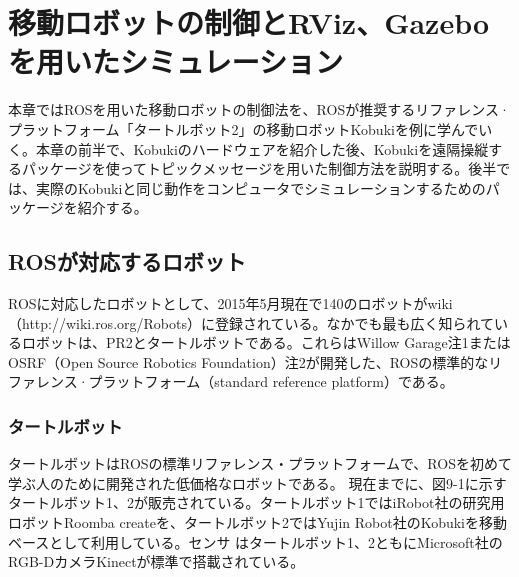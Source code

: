 
\chapter{移動ロボットの制御とRViz、Gazeboを用いたシミュレーション}

本章ではROSを用いた移動ロボットの制御法を、ROSが推奨するリファレンス·プラットフォーム「タートルボット2」の移動ロボットKobukiを例に学んでいく。本章の前半で、Kobukiのハードウェアを紹介した後、Kobukiを遠隔操縦するパッケージを使ってトピックメッセージを用いた制御方法を説明する。後半では、実際のKobukiと同じ動作をコンピュータでシミュレーションするためのパッケージを紹介する。

\section{ROSが対応するロボット}

ROSに対応したロボットとして、2015年5月現在で140のロボットがwiki（http://wiki.ros.org/Robots）に登録されている。なかでも最も広く知られているロボットは、PR2とタートルボットである。これらはWillow Garage注1またはOSRF（Open Source Robotics Foundation）注2が開発した、ROSの標準的なリファレンス·プラットフォーム（standard reference platform）である。

\subsection{タートルボット}

タートルボットはROSの標準リファレンス・プラットフォームで、ROSを初めて学ぶ人のために開発された低価格なロボットである。
現在までに、図9-1に示すタートルボット1、2が販売されている。タートルボット1ではiRobot社の研究用ロボットRoomba createを、タートルボット2ではYujin Robot社のKobukiを移動ベースとして利用している。センサ    はタートルボット1、2ともにMicrosoft社のRGB-DカメラKinectが標準で搭載されている。

